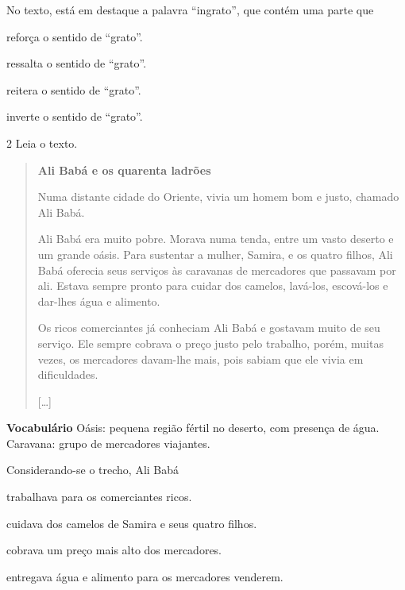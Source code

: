 No texto, está em destaque a palavra ``ingrato'', que contém uma parte que

\begin{escolha}
\item reforça o sentido de ``grato''.

\item ressalta o sentido de ``grato''.

\item reitera o sentido de ``grato''.

\item inverte o sentido de ``grato''.
\end{escolha}

\num{2} Leia o texto.

\begin{quote}
\textbf{Ali Babá e os quarenta ladrões}

Numa distante cidade do Oriente, vivia um homem bom e justo, chamado Ali
Babá.

Ali Babá era muito pobre. Morava numa tenda, entre um vasto deserto e um
grande oásis. Para sustentar a mulher, Samira, e os quatro filhos, Ali
Babá oferecia seus serviços às caravanas de mercadores que passavam por
ali. Estava sempre pronto para cuidar dos camelos, lavá-los, escová-los
e dar-lhes água e alimento.

Os ricos comerciantes já conheciam Ali Babá e gostavam muito de seu
serviço. Ele sempre cobrava o preço justo pelo trabalho, porém, muitas
vezes, os mercadores davam-lhe mais, pois sabiam que ele vivia em
dificuldades.

{[}\ldots{}{]}

\end{quote}

\textbf{Vocabulário}
Oásis: pequena região fértil no deserto, com presença de água.
Caravana: grupo de mercadores viajantes.

Considerando-se o trecho, Ali Babá

\begin{escolha}
\item trabalhava para os comerciantes ricos.

\item cuidava dos camelos de Samira e seus quatro filhos.

\item cobrava um preço mais alto dos mercadores.

\item entregava água e alimento para os mercadores venderem.
\end{escolha}



